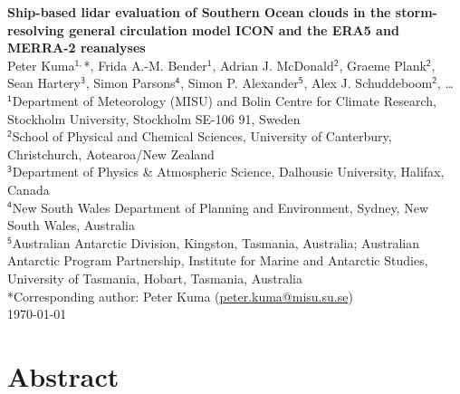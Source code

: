 \documentclass[12pt,a4paper]{article}
\begin{document}
\fontsize{13pt}{15pt}\selectfont

\begin{center} \Large \sffamily\textbf{Ship-based lidar evaluation of Southern Ocean clouds in the storm-resolving general circulation model ICON and the ERA5 and MERRA-2 reanalyses}\\[0.4cm]
\large Peter Kuma$^\mathsf{1,}$*, Frida A.-M. Bender$^\mathsf{1}$, Adrian J. McDonald$^\mathsf{2}$, Graeme Plank$^\mathsf{2}$, Sean Hartery$^\mathsf{3}$, Simon Parsons$^\mathsf{4}$, Simon P. Alexander$^\mathsf{5}$, Alex J. Schuddeboom$^\mathsf{2}$, \ldots\\[0.4cm]
\small
$^\mathsf{1}$Department of Meteorology (MISU) and Bolin Centre for Climate Research, Stockholm University, Stockholm SE-106 91, Sweden\\
$^\mathsf{2}$School of Physical and Chemical Sciences, University of Canterbury, Christchurch, Aotearoa/New Zealand\\
$^\mathsf{3}$Department of Physics \& Atmospheric Science, Dalhousie University, Halifax, Canada\\
$^\mathsf{4}$New South Wales Department of Planning and Environment, Sydney, New South Wales, Australia\\
$^\mathsf{5}$Australian Antarctic Division, Kingston, Tasmania, Australia; Australian Antarctic Program Partnership, Institute for Marine and Antarctic Studies, University of Tasmania, Hobart, Tasmania, Australia\\[0.2cm]
*Corresponding author: Peter Kuma (\href{mailto:peter.kuma@misu.su.se}{peter.kuma@misu.su.se})\\[0.4cm]
\large \today\\[0.4cm]

\end{center}

\section*{Abstract}
\end{document}
